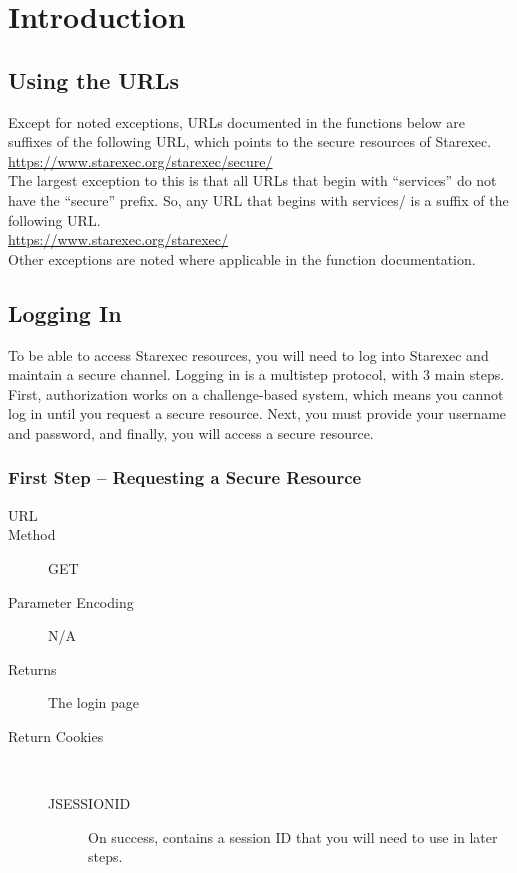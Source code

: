 \chapter{Introduction}
\section{Using the URLs}

Except for noted exceptions, URLs documented in the functions below are suffixes of the following URL, which points to the secure resources of Starexec.
\\\url{https://www.starexec.org/starexec/secure/}\\

The largest exception to this is that all URLs that begin with ``services'' do not have the ``secure'' prefix. So, any URL that begins with services/ is a suffix of the following URL.
\\\url{https://www.starexec.org/starexec/}\\

Other exceptions are noted where applicable in the function documentation.


\section{Logging In}

To be able to access Starexec resources, you will need to log into Starexec and maintain a secure channel. Logging in is a multistep protocol, with 3 main steps. First, authorization works on a challenge-based system, which means you cannot log in until you request a secure resource. Next, you must provide your username and password, and finally, you will access a secure resource.

\subsection*{First Step -- Requesting a Secure Resource}

\begin{description}
\item [URL] 
\item [Method] GET
\item [Parameter Encoding] N/A
\item [Returns] The login page
\item [Return Cookies] \

	\begin{description}
	\item [JSESSIONID]  On success, contains a session ID that you will need to use in later steps.
	\end{description}
\end{description}

